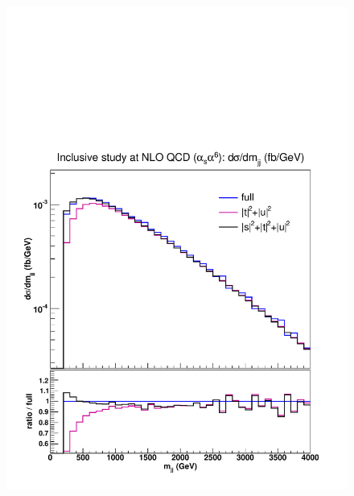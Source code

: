 \begin{figure}[hbt]
\centering
{\includegraphics[scale=0.35]{figures/scanfigures/mjj_nlo.pdf}}

\end{figure}
